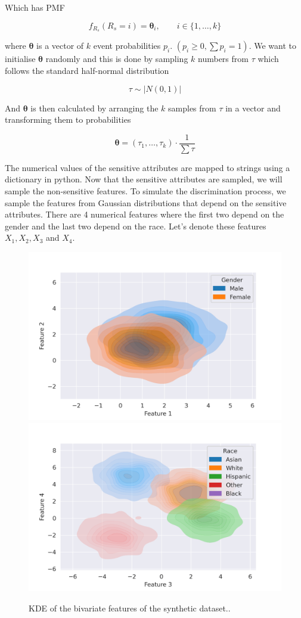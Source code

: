 Which has PMF

\begin{equation*}
    f_{R_s}(R_s = i) = \boldsymbol{\theta}_i, \qquad i \in \{ 1, \dots, k\}
\end{equation*}

where $\boldsymbol{\theta}$ is a vector of $k$ event probabilities $p_i$. $(p_i \geq 0, \sum p_i = 1)$. We want to initialise $\boldsymbol{\theta}$ randomly and this is done by sampling $k$ numbers from $\tau$ which follows the standard half-normal distribution

\begin{equation*}
    \tau \sim |N(0, 1)|
\end{equation*}

And $\boldsymbol{\theta}$ is then calculated by arranging the $k$ samples from $\tau$ in a vector and transforming them to probabilities 

\begin{equation*}
    \boldsymbol{\theta} = ({\tau_1, \dots, \tau_k}) \cdot \frac{1}{\sum \tau}
\end{equation*}

The numerical values of the sensitive attributes are mapped to strings using a dictionary in python. Now that the sensitive attributes are sampled, we will sample the non-sensitive features. To simulate the discrimination process, we sample the features from Gaussian distributions that depend on the sensitive attributes. There are 4 numerical features where the first two depend on the gender and the last two depend on the race. Let's denote these features $X_1, X_2, X_3$ and $X_4$.

\begin{figure}
    \centering
    \includegraphics[width=0.49\linewidth]{figures/synthetic-gender.png}
    \includegraphics[width=0.49\linewidth]{figures/synthetic-race.png}
    \caption{KDE of the bivariate features of the synthetic dataset..}
    \label{fig:synthdatasetfeatures}
\end{figure}


